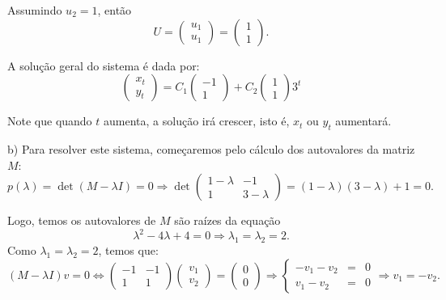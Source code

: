 Assumindo $u_2 = 1$, então 
$$U =
\left(\begin{array}{r} u_1 \\ u_1 \end{array}\right)
=
\left(\begin{array}{r} 1 \\ 1 \end{array}\right).
$$

A solução geral do sistema é dada por:
$$
\left(\begin{array}{c} x_t \\ y_t \end{array}\right)
=
C_1 \left(\begin{array}{c} -1 \\ 1 \end{array}\right)
+
C_2 \left(\begin{array}{c}  1 \\ 1 \end{array}\right) 3^t
$$

Note que quando $t$ aumenta, a solução irá crescer, isto é, $x_{t}$ ou $y_{t}$ aumentará. 



b) Para resolver este sistema, começaremos pelo cálculo dos autovalores da matriz $M$:
$$p(\lambda) = \det(M - \lambda I) = 0 \Rightarrow
\det
\left(\begin{array}{cc}
1-\lambda & -1 \\
1 & 3-\lambda \end{array}\right)
= (1-\lambda) (3-\lambda)+1 = 0.
$$

Logo, temos os autovalores de $M$ são raízes da equação
$$\lambda^{2} - 4\lambda +4=0 \Rightarrow  \lambda_{1} = \lambda_{2} = 2.$$
Como $\lambda_{1} = \lambda_{2} = 2$, temos que:
$$(M - \lambda I) v = 0 \Leftrightarrow
\left(\begin{array}{cc} -1 & -1 \\ 1 & 1 \end{array}\right)
\left(\begin{array}{c} v_1 \\ v_2 \end{array}\right)
= 
\left(\begin{array}{c} 0 \\ 0 \end{array}\right)
\Rightarrow  
\left\{\begin{array}{rcl} -v_1 - v_2 &=& 0 \\ v_1 - v_2 &=& 0 \end{array}\right. \Rightarrow  v_1 = -v_2.
$$

